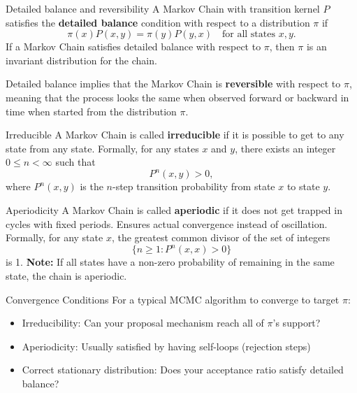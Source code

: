 \begin{frame}{Detailed balance and reversibility}
    A Markov Chain with transition kernel $P$ satisfies the \textbf{detailed balance} condition with respect to a distribution $\pi$ if
    \begin{equation*}
        \pi(x) P(x, y) = \pi(y) P(y, x) \quad \text{for all states } x, y.
    \end{equation*}
    If a Markov Chain satisfies detailed balance with respect to $\pi$, then $\pi$ is an invariant distribution for the chain.
    
    \vspace{0.5cm}
    Detailed balance implies that the Markov Chain is \textbf{reversible} with respect to $\pi$,
    meaning that the process looks the same when observed forward or backward in time when 
    started from the distribution $\pi$.
\end{frame}

\begin{frame}{Irreducible}
    A Markov Chain is called \textbf{irreducible} if it is possible to get to any state 
    from any state. Formally, for any states $x$ and $y$, there exists an integer
    $0 \leq n < \infty$ such that
    \begin{equation*}
        P^n(x, y) > 0,
    \end{equation*}
    where $P^n(x, y)$ is the $n$-step transition probability from state $x$ to state $y$.
\end{frame}

\begin{frame}{Aperiodicity}
    A Markov Chain is called \textbf{aperiodic} if it does not get trapped in cycles with fixed periods. Ensures actual convergence instead of oscillation.
    Formally, for any state $x$, the greatest common divisor of the set of integers
    \begin{equation*}
        \{ n \geq 1 : P^n(x, x) > 0 \}
    \end{equation*}
    is 1.
    \textbf{Note:} If all states have a non-zero probability of remaining in the same state, the chain is aperiodic.
\end{frame}

\begin{frame}{Convergence Conditions}
    For a typical MCMC algorithm to converge to target $\pi$:
    \begin{itemize}
        \item Irreducibility: Can your proposal mechanism reach all of $\pi$'s support?
        \item Aperiodicity: Usually satisfied by having self-loops (rejection steps)
        \item Correct stationary distribution: Does your acceptance ratio satisfy detailed balance?
    \end{itemize}
\end{frame}

